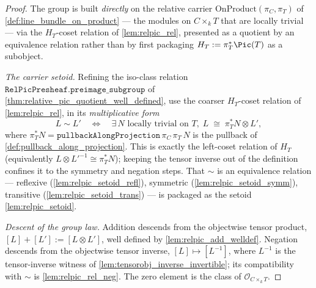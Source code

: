 \begin{proof}
\leanok
  The group is built \emph{directly} on the relative carrier
  \(\mathrm{OnProduct}(\pi_C, \pi_T)\) of \cref{def:line_bundle_on_product}
  --- the modules on \(C \times_k T\) that are locally trivial --- via the
  \(H_T\)-coset relation of \cref{lem:relpic_rel}, presented as a quotient by an
  equivalence relation rather than by first packaging \(H_T := \pi_T^*\Pic(T)\)
  as a subobject.

  \emph{The carrier setoid.} Refining the iso-class relation
  \(\mathtt{RelPicPresheaf.preimage\_subgroup}\) of
  \cref{thm:relative_pic_quotient_well_defined}, use the coarser \(H_T\)-coset
  relation of \cref{lem:relpic_rel}, in its \emph{multiplicative form}
  \[
    L \sim L' \quad\Longleftrightarrow\quad
      \exists\, N \text{ locally trivial on } T,\;
      L \;\cong\; \pi_T^* N \otimes L' ,
  \]
  where \(\pi_T^* N = \mathtt{pullbackAlongProjection}\,\pi_C\,\pi_T\,N\) is the
  pullback of \cref{def:pullback_along_projection}. This is exactly the
  left-coset relation of \(H_T\) (equivalently \(L \otimes L'^{-1} \cong \pi_T^*
  N\)); keeping the tensor inverse out of the definition confines it to the
  symmetry and negation steps. That \(\sim\) is an equivalence relation ---
  reflexive (\cref{lem:relpic_setoid_refl}), symmetric
  (\cref{lem:relpic_setoid_symm}), transitive (\cref{lem:relpic_setoid_trans})
  --- is packaged as the setoid \cref{lem:relpic_setoid}.

  \emph{Descent of the group law.} Addition descends from the objectwise tensor
  product, \([L] + [L'] := [L \otimes L']\), well defined by
  \cref{lem:relpic_add_welldef}. Negation descends from the objectwise tensor
  inverse, \([L] \mapsto [L^{-1}]\), where \(L^{-1}\) is the tensor-inverse
  witness of \cref{lem:tensorobj_inverse_invertible}; its compatibility with
  \(\sim\) is \cref{lem:relpic_rel_neg}. The zero element is the class of
  \(\mathcal{O}_{C \times_k T}\).


\end{proof}
